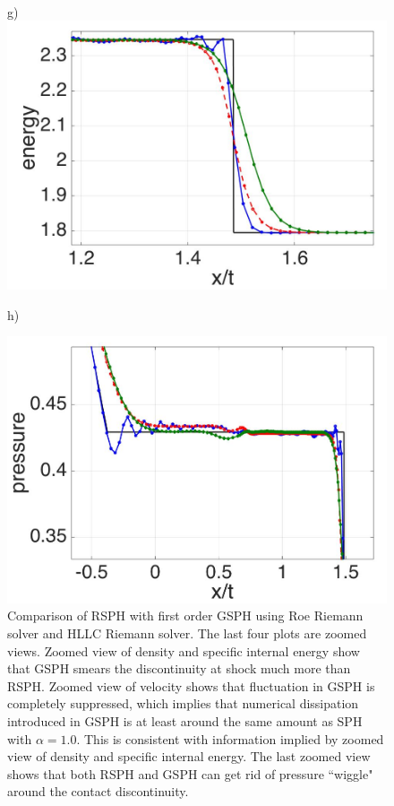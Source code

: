 \documentclass[review]{elsarticle}
\begin{document}
\begin{figure}[H]
\begin{minipage}{.545\textwidth}
\begin{flushleft}
        \end{flushleft}
    \end{minipage}%
       \\
    \begin{minipage}{.45 \textwidth}
        \centering g)
        \includegraphics[width=0.99 \textwidth,height=0.6\textwidth]{./Figures/RCM-Sod-GSPH-compare-e-zoom}
    \end{minipage}%
    \begin{minipage}{.545\textwidth}
    \centering h)
        \begin{flushleft}
        \includegraphics[width= 0.8174 \textwidth, height=0.4954 \textwidth]{./Figures/RCM-Sod-GSPH-compare-p-zoom}    
        \end{flushleft}
    \end{minipage}%
    \caption{Comparison of RSPH with first order GSPH using Roe Riemann solver and HLLC Riemann solver. The last four plots are zoomed views. Zoomed view of density and specific internal energy show that GSPH smears the discontinuity at shock much more than RSPH. Zoomed view of velocity shows that fluctuation in GSPH is completely suppressed, which implies that numerical dissipation introduced in GSPH is at least around the same amount as SPH with $\alpha=1.0$. This is consistent with information implied by zoomed view of density and specific internal energy. The last zoomed view shows that both RSPH and GSPH can get rid of pressure ``wiggle" around the contact discontinuity.}
    \label{fig:RCM-Sod-GSPH}
\end{figure}
\end{document}
